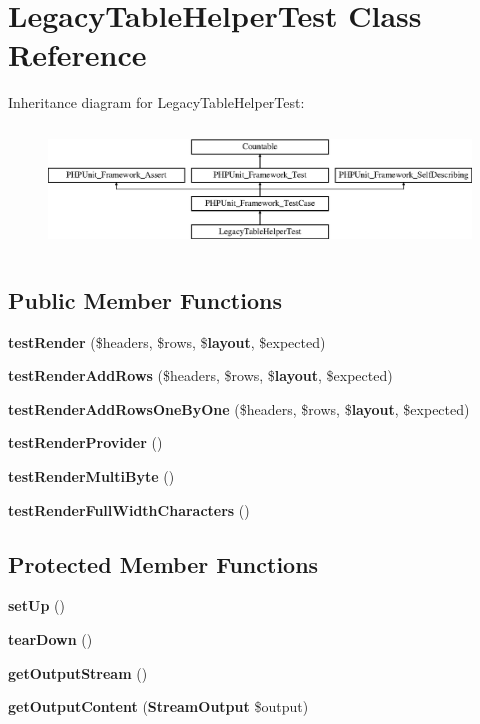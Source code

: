 \section{Legacy\+Table\+Helper\+Test Class Reference}
\label{class_symfony_1_1_component_1_1_console_1_1_tests_1_1_helper_1_1_legacy_table_helper_test}
Inheritance diagram for Legacy\+Table\+Helper\+Test\+:\begin{figure}[H]
\begin{center}
\leavevmode
\includegraphics[height=3.303835cm]{class_symfony_1_1_component_1_1_console_1_1_tests_1_1_helper_1_1_legacy_table_helper_test}
\end{center}
\end{figure}
\subsection*{Public Member Functions}
\begin{DoxyCompactItemize}
\item 
{\bf test\+Render} (\$headers, \$rows, \${\bf layout}, \$expected)
\item 
{\bf test\+Render\+Add\+Rows} (\$headers, \$rows, \${\bf layout}, \$expected)
\item 
{\bf test\+Render\+Add\+Rows\+One\+By\+One} (\$headers, \$rows, \${\bf layout}, \$expected)
\item 
{\bf test\+Render\+Provider} ()
\item 
{\bf test\+Render\+Multi\+Byte} ()
\item 
{\bf test\+Render\+Full\+Width\+Characters} ()
\end{DoxyCompactItemize}
\subsection*{Protected Member Functions}
\begin{DoxyCompactItemize}
\item 
{\bf set\+Up} ()
\item 
{\bf tear\+Down} ()
\item 
{\bf get\+Output\+Stream} ()
\item 
{\bf get\+Output\+Content} ({\bf Stream\+Output} \$output)
\end{DoxyCompactItemize}
